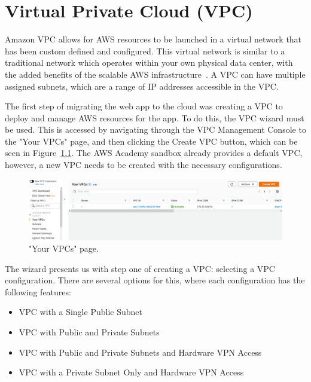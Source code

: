 \chapter{Virtual Private Cloud (VPC)}\label{ch:vpc}

Amazon VPC allows for AWS resources to be launched in a virtual network that has been custom defined and configured.
This virtual network is similar to a traditional network which operates within your own physical data center, with the
added benefits of the scalable AWS infrastructure~\parencite{amazon2022what}.
A VPC can have multiple assigned subnets, which are a range of IP addresses accessible in the VPC\@.

The first step of migrating the web app to the cloud was creating a VPC to deploy and manage AWS resources for the app.
To do this, the VPC wizard must be used.
This is accessed by navigating through the VPC Management Console to the "Your VPCs" page, and then clicking the Create
VPC button, which can be seen in Figure~\ref{fig:vpc-wizard}.
The AWS Academy sandbox already provides a default VPC, however, a new VPC needs to be created with the necessary
configurations.

\begin{figure}[!htbp]
    \centering
    \includegraphics[width=\textwidth]{resources/vpc/your-vpcs-before}
    \caption{"Your VPCs" page.}
    \label{fig:vpc-wizard}
\end{figure}

The wizard presents us with step one of creating a VPC: selecting a VPC configuration.
There are several options for this, where each configuration has the following features:

\begin{itemize}
    \item VPC with a Single Public Subnet
    \item VPC with Public and Private Subnets
    \item VPC with Public and Private Subnets and Hardware VPN Access
    \item VPC with a Private Subnet Only and Hardware VPN Access
\end{itemize}
